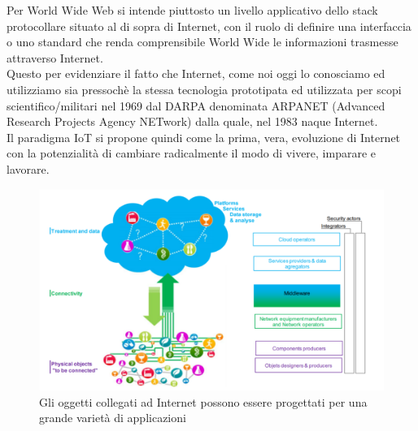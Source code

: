Per World Wide Web si intende piuttosto un livello applicativo dello stack protocollare situato al di sopra di Internet, con il ruolo di definire una interfaccia o uno standard che renda comprensibile World Wide le informazioni trasmesse attraverso Internet.\\
Questo per evidenziare il fatto che Internet, come noi oggi lo conosciamo ed utilizziamo sia pressochè la stessa tecnologia prototipata ed utilizzata per scopi scientifico/militari nel 1969 dal DARPA denominata ARPANET (Advanced Research Projects Agency NETwork) dalla quale, nel 1983 naque Internet.\\
Il paradigma IoT si propone quindi come la prima, vera, evoluzione di Internet con la potenzialità di cambiare radicalmente il modo di vivere, imparare e lavorare. \cite{famous:paper_cisco_intro}
\begin{figure}
	\begin{center}
		\includegraphics[width=0.9\columnwidth]{images/iot_revolution.png}
	\end{center}
	\caption{Gli oggetti collegati ad Internet possono essere progettati per una grande varietà di applicazioni \cite{famous:paper_francese}}
	\label{fig:iot_revolution}
\end{figure}




